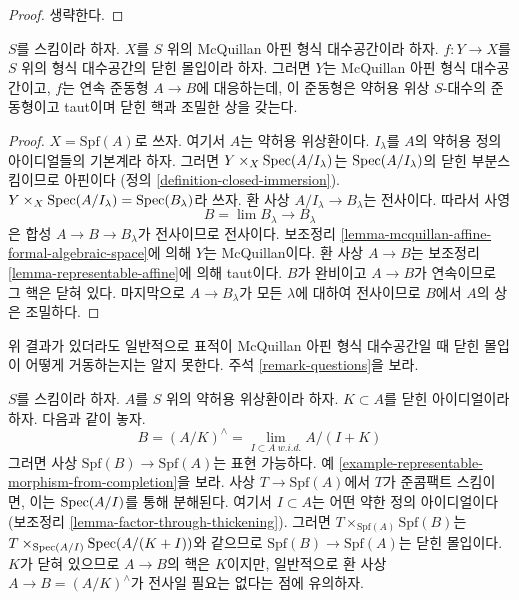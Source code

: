 \begin{proof}
생략한다.
\end{proof}

\begin{lemma}
\label{lemma-closed-immersion-into-McQuillan}
$S$를 스킴이라 하자. $X$를 $S$ 위의 McQuillan 아핀 형식
대수공간이라 하자. $f : Y \to X$를 $S$ 위의 형식 대수공간의
닫힌 몰입이라 하자. 그러면 $Y$는 McQuillan 아핀 형식 대수공간이고,
$f$는 연속 준동형 $A \to B$에 대응하는데, 이 준동형은 약허용 위상
$S$-대수의 준동형이고 taut이며 닫힌 핵과 조밀한 상을 갖는다.
\end{lemma}

\begin{proof}
$X = \text{Spf}(A)$로 쓰자. 여기서 $A$는 약허용 위상환이다.
$I_\lambda$를 $A$의 약허용 정의 아이디얼들의 기본계라 하자.
그러면 $Y \times_X \mathop{\mathrm{Spec}}(A/I_\lambda)$는
$\mathop{\mathrm{Spec}}(A/I_\lambda)$의 닫힌 부분스킴이므로 아핀이다
(정의 \ref{definition-closed-immersion}).
$Y \times_X \mathop{\mathrm{Spec}}(A/I_\lambda) = \mathop{\mathrm{Spec}}(B_\lambda)$라 쓰자.
환 사상 $A/I_\lambda \to B_\lambda$는 전사이다. 따라서 사영
$$
B = \lim B_\lambda \longrightarrow B_\lambda
$$
은 합성 $A \to B \to B_\lambda$가 전사이므로 전사이다. 보조정리
\ref{lemma-mcquillan-affine-formal-algebraic-space}에
의해 $Y$는 McQuillan이다. 환 사상 $A \to B$는 보조정리
\ref{lemma-representable-affine}에 의해 taut이다. $B$가 완비이고
$A \to B$가 연속이므로 그 핵은 닫혀 있다. 마지막으로
$A \to B_\lambda$가 모든 $\lambda$에 대하여 전사이므로 $B$에서
$A$의 상은 조밀하다.
\end{proof}

\noindent
위 결과가 있더라도 일반적으로 표적이 McQuillan 아핀 형식 대수공간일 때
닫힌 몰입이 어떻게 거동하는지는 알지 못한다. 주석
\ref{remark-questions}을 보라.

\begin{example}
\label{example-closed-immersion-from-quotient}
$S$를 스킴이라 하자. $A$를 $S$ 위의 약허용 위상환이라 하자.
$K \subset A$를 닫힌 아이디얼이라 하자. 다음과 같이 놓자.
$$
B = (A/K)^\wedge = \lim_{I \subset A\ w.i.d.} A/(I + K)
$$
그러면 사상 $\text{Spf}(B) \to \text{Spf}(A)$는 표현 가능하다.
예 \ref{example-representable-morphism-from-completion}을 보라.
사상 $T \to \text{Spf}(A)$에서 $T$가 준콤팩트 스킴이면,
이는 $\mathop{\mathrm{Spec}}(A/I)$를 통해 분해된다. 여기서 $I \subset A$는 어떤
약한 정의 아이디얼이다(보조정리 \ref{lemma-factor-through-thickening}).
그러면 $T \times_{\text{Spf}(A)} \text{Spf}(B)$는
$T \times_{\mathop{\mathrm{Spec}}(A/I)} \mathop{\mathrm{Spec}}(A/(K + I))$와 같으므로
$\text{Spf}(B) \to \text{Spf}(A)$는 닫힌 몰입이다.
$K$가 닫혀 있으므로 $A \to B$의 핵은 $K$이지만, 일반적으로 환 사상
$A \to B = (A/K)^\wedge$가 전사일 필요는 없다는 점에 유의하자.
\end{example}

